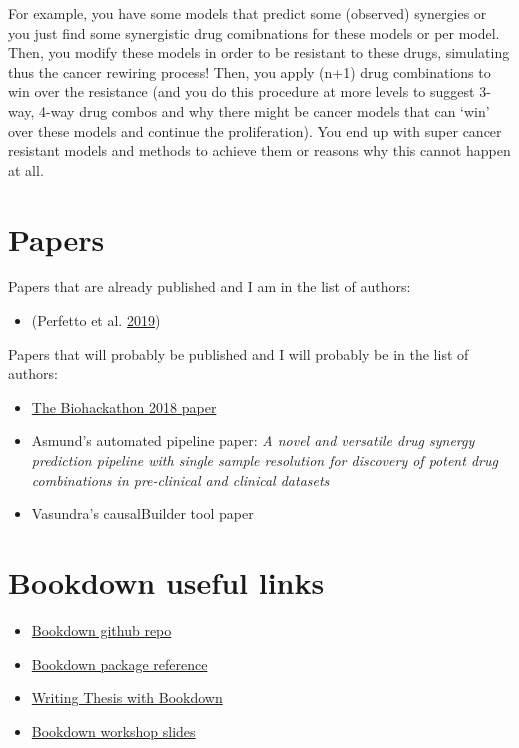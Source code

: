 \documentclass[12pt,]{book}
\providecommand{\tightlist}{%
  \setlength{\itemsep}{0pt}\setlength{\parskip}{0pt}}
\begin{document}
For example, you have some models that predict some (observed) synergies or you
just find some synergistic drug comibnations for these models or per model.
Then, you modify these models in order to be resistant to these drugs, simulating
thus the cancer rewiring process! Then, you apply (n+1) drug combinations to
win over the resistance (and you do this procedure at more levels to suggest
3-way, 4-way drug combos and why there might be cancer models that can `win'
over these models and continue the proliferation). You end up with super cancer
resistant models and methods to achieve them or reasons why this cannot happen
at all.

\hypertarget{appendix-appendix}{%
\appendix}


\hypertarget{papers-1}{%
\chapter*{Papers}\label{papers-1}}

Papers that are already published and I am in the list of authors:

\begin{itemize}
\tightlist
\item
  (Perfetto et al. \protect\hyperlink{ref-Perfetto2019}{2019})
\end{itemize}

Papers that will probably be published and I will probably be in the list of authors:

\begin{itemize}
\tightlist
\item
  \href{www.tinyurl.com/bh2018write}{The Biohackathon 2018 paper}
\item
  Asmund's automated pipeline paper: \emph{A novel and versatile drug synergy prediction pipeline with single sample resolution for discovery of potent drug combinations in pre-clinical and clinical datasets}
\item
  Vasundra's causalBuilder tool paper
\end{itemize}

\hypertarget{bookdown-useful-links}{%
\chapter*{Bookdown useful links}\label{bookdown-useful-links}}

\begin{itemize}
\tightlist
\item
  \href{https://github.com/rstudio/bookdown/}{Bookdown github repo}
\item
  \href{https://bookdown.org/yihui/bookdown/}{Bookdown package reference}
\item
  \href{https://eddjberry.netlify.com/post/writing-your-thesis-with-bookdown/}{Writing Thesis with Bookdown}
\item
  \href{https://arm.rbind.io/slides/bookdown.html}{Bookdown workshop slides}
\end{itemize}
\end{document}

